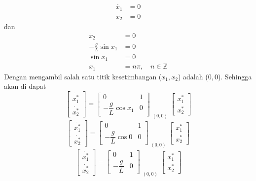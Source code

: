 \documentclass{article}
\begin{document}
\begin{align*}
    \dot{x_1} & = 0 \\
    x_2       & = 0
\end{align*}
dan
\begin{align*}
    \dot{x_2}              & = 0                            \\
    -\frac{g}{L} \sin{x_1} & = 0                            \\
    \sin{x_1}              & = 0                            \\
    x_1                    & = n\pi, \quad n \in \mathbb{Z}
\end{align*}
Dengan mengambil salah satu titik kesetimbangan ($x_1,x_2$) adalah ($0,0$). Sehingga akan di dapat \\
\[
    \begin{bmatrix}
        \dot{x_1^*} \\
        \dot{x_2^*}
    \end{bmatrix}
    = \begin{bmatrix}
        0                      & 1 \\
        -\dfrac{g}{L} \cos x_1 & 0
    \end{bmatrix} _{\substack{(0, 0)}}
    \begin{bmatrix}
        x_1^* \\
        x_2^*
    \end{bmatrix}
\]
\[
    \begin{bmatrix}
        \dot{x_1^*} \\
        \dot{x_2^*}
    \end{bmatrix}
    = \begin{bmatrix}
        0                    & 1 \\
        -\dfrac{g}{L} \cos 0 & 0
    \end{bmatrix} _{\substack{(0, 0)}}
    \begin{bmatrix}
        x_1^* \\
        x_2^*
    \end{bmatrix}
\]
\[
    \begin{bmatrix}
        \dot{x_1^*} \\
        \dot{x_2^*}
    \end{bmatrix}
    = \begin{bmatrix}
        0             & 1 \\
        -\dfrac{g}{L} & 0
    \end{bmatrix} _{\substack{(0, 0)}}
    \begin{bmatrix}
        x_1^* \\
        x_2^*
    \end{bmatrix}
\]
\end{document}
